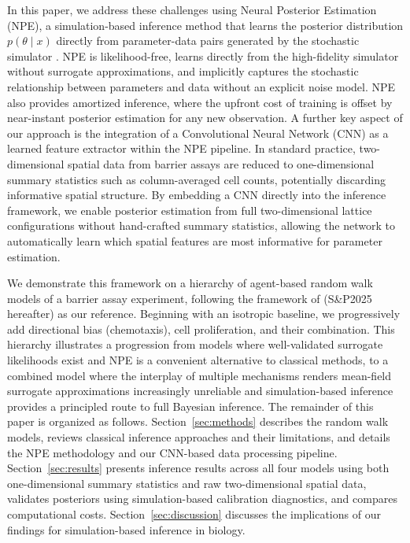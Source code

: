 \documentclass{article}
\newcommand{\SP}{S\&P2025}
\begin{document}
In this paper, we address these challenges using Neural Posterior Estimation (NPE), a simulation-based inference method that learns the posterior distribution $p(\theta \mid x)$ directly from parameter-data pairs generated by the stochastic simulator \citep{papamakarios2016fast,greenberg2019automatic,Cranmer2020FrontierSBI}. NPE is likelihood-free, learns directly from the high-fidelity simulator without surrogate approximations, and implicitly captures the stochastic relationship between parameters and data without an explicit noise model. NPE also provides amortized inference, where the upfront cost of training is offset by near-instant posterior estimation for any new observation. A further key aspect of our approach is the integration of a Convolutional Neural Network (CNN) as a learned feature extractor within the NPE pipeline. In standard practice, two-dimensional spatial data from barrier assays are reduced to one-dimensional summary statistics such as column-averaged cell counts, potentially discarding informative spatial structure. By embedding a CNN directly into the inference framework, we enable posterior estimation from full two-dimensional lattice configurations without hand-crafted summary statistics, allowing the network to automatically learn which spatial features are most informative for parameter estimation.

We demonstrate this framework on a hierarchy of agent-based random walk models of a barrier assay experiment, following the framework of \cite{Simpson2025.05.25.656057} (\SP{} hereafter) as our reference. Beginning with an isotropic baseline, we progressively add directional bias (chemotaxis), cell proliferation, and their combination. This hierarchy illustrates a progression from models where well-validated surrogate likelihoods exist and NPE is a convenient alternative to classical methods, to a combined model where the interplay of multiple mechanisms renders mean-field surrogate approximations increasingly unreliable and simulation-based inference provides a principled route to full Bayesian inference. The remainder of this paper is organized as follows. Section~\ref{sec:methods} describes the random walk models, reviews classical inference approaches and their limitations, and details the NPE methodology and our CNN-based data processing pipeline. Section~\ref{sec:results} presents inference results across all four models using both one-dimensional summary statistics and raw two-dimensional spatial data, validates posteriors using simulation-based calibration diagnostics, and compares computational costs. Section~\ref{sec:discussion} discusses the implications of our findings for simulation-based inference in biology.
\end{document}
